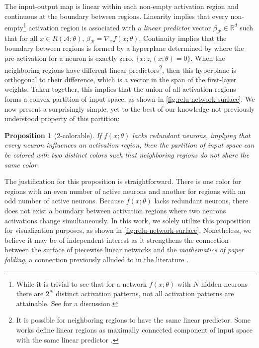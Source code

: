 \documentclass{article}
\theoremstyle{plain}
\newtheorem{proposition}[theorem]{Proposition}
\theoremstyle{definition}
\theoremstyle{remark}
\begin{document}
The input-output map is linear within each non-empty activation region and continuous at the boundary between regions.
%
Linearity implies that every non-empty\footnote{While it is trivial to see that for a network $f(x;\theta)$ with $N$ hidden neurons there are $2^N$ distinct activation patterns, not all activation patterns are attainable. See \citet{raghu2017expressive} for a discussion.} activation region is associated with a \emph{linear predictor} vector $\beta_{\mathcal{R}} \in \mathbb{R}^d$ such that for all $x \in R(\mathcal{A}; \theta)$, $\beta_\mathcal{R} = \nabla_x f(x;\theta)$.
%
Continuity implies that the boundary between regions is formed by a hyperplane determined by where the pre-activation for a neuron is exactly zero, $\{x : z_i(x;\theta) = 0\}$.
%
When the neighboring regions have different linear predictors\footnote{It is possible for neighboring regions to have the same linear predictor. Some works define linear regions as maximally connected component of input space with the same linear predictor \cite{hanin2019deep}.}, then this hyperplane is orthogonal to their difference, which is a vector in the span of the first-layer weights.
%
Taken together, this implies that the union of all activation regions forms a convex partition of input space, as shown in \cref{fig:relu-network-surface}.
%
We now present a surprisingly simple, yet to the best of our knowledge not previously understood property of this partition:

\begin{proposition}[2-colorable]
    If $f(x;\theta)$ lacks redundant neurons, implying that every neuron influences an activation region, then the partition of input space can be colored with two distinct colors such that neighboring regions do not share the same color.
\end{proposition}

The justification for this proposition is straightforward.
%
There is one color for regions with an even number of active neurons and another for regions with an odd number of active neurons.
%
Because $f(x;\theta)$ lacks redundant neurons, there does not exist a boundary between activation regions where two neurons activations change simultaneously.
%
In this work, we solely utilize this proposition for visualization purposes, as shown in \cref{fig:relu-network-surface}.
%
Nonetheless, we believe it may be of independent interest as it strengthens the connection between the surface of piecewise linear networks and the \emph{mathematics of paper folding}, a connection previously alluded to in the literature \cite{montufar2014number}.
\end{document}
